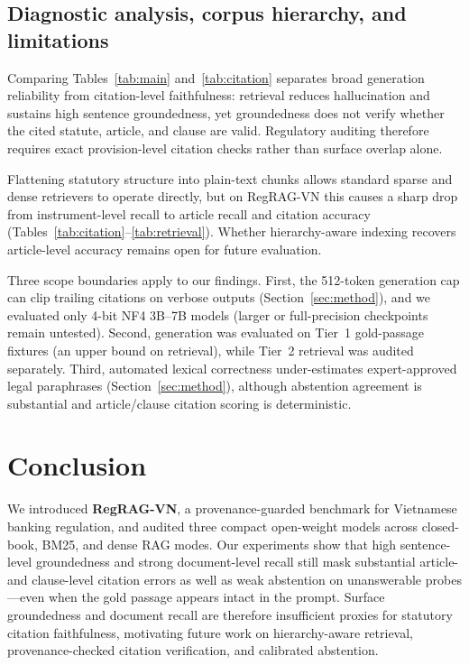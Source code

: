 \documentclass[conference,a4paper]{IEEEtran}
\begin{document}
\subsection{Diagnostic analysis, corpus hierarchy, and limitations}
\label{sec:disclosure}
Comparing Tables~\ref{tab:main} and~\ref{tab:citation} separates broad generation reliability from citation-level faithfulness: retrieval reduces hallucination and sustains high sentence groundedness, yet groundedness does not verify whether the cited statute, article, and clause are valid. Regulatory auditing therefore requires exact provision-level citation checks rather than surface overlap alone.

Flattening statutory structure into plain-text chunks allows standard sparse and dense retrievers to operate directly, but on RegRAG-VN this causes a sharp drop from instrument-level recall to article recall and citation accuracy (Tables~\ref{tab:citation}--\ref{tab:retrieval}). Whether hierarchy-aware indexing recovers article-level accuracy remains open for future evaluation.

Three scope boundaries apply to our findings. First, the 512-token generation cap can clip trailing citations on verbose outputs (Section~\ref{sec:method}), and we evaluated only 4-bit NF4 3B--7B models (larger or full-precision checkpoints remain untested). Second, generation was evaluated on Tier~1 gold-passage fixtures (an upper bound on retrieval), while Tier~2 retrieval was audited separately. Third, automated lexical correctness under-estimates expert-approved legal paraphrases (Section~\ref{sec:method}), although abstention agreement is substantial and article/clause citation scoring is deterministic.

\section{Conclusion}
\label{sec:conclusion}

We introduced \textbf{RegRAG-VN}, a provenance-guarded benchmark for Vietnamese banking regulation, and audited three compact open-weight models across closed-book, BM25, and dense RAG modes. Our experiments show that high sentence-level groundedness and strong document-level recall still mask substantial article- and clause-level citation errors as well as weak abstention on unanswerable probes---even when the gold passage appears intact in the prompt. Surface groundedness and document recall are therefore insufficient proxies for statutory citation faithfulness, motivating future work on hierarchy-aware retrieval, provenance-checked citation verification, and calibrated abstention.
\end{document}
